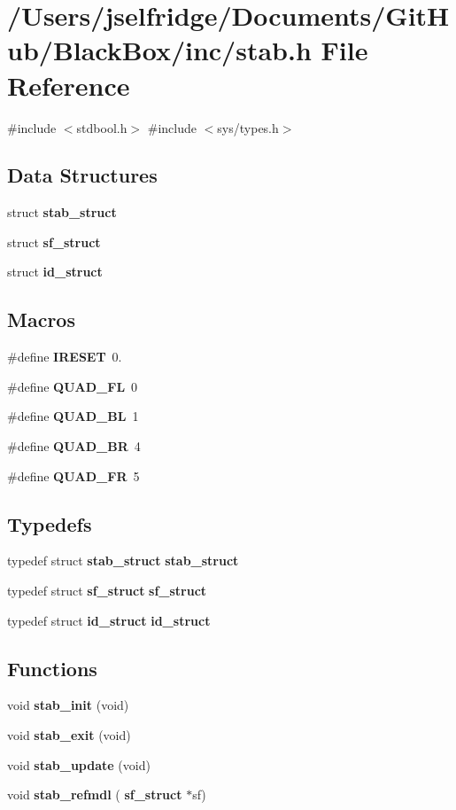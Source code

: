 \section{/\+Users/jselfridge/\+Documents/\+Git\+Hub/\+Black\+Box/inc/stab.h File Reference}
\label{stab_8h}
{\ttfamily \#include $<$stdbool.\+h$>$}\newline
{\ttfamily \#include $<$sys/types.\+h$>$}\newline
\subsection*{Data Structures}
\begin{DoxyCompactItemize}
\item 
struct \textbf{ stab\+\_\+struct}
\item 
struct \textbf{ sf\+\_\+struct}
\item 
struct \textbf{ id\+\_\+struct}
\end{DoxyCompactItemize}
\subsection*{Macros}
\begin{DoxyCompactItemize}
\item 
\#define \textbf{ I\+R\+E\+S\+ET}~0.
\item 
\#define \textbf{ Q\+U\+A\+D\+\_\+\+FL}~0
\item 
\#define \textbf{ Q\+U\+A\+D\+\_\+\+BL}~1
\item 
\#define \textbf{ Q\+U\+A\+D\+\_\+\+BR}~4
\item 
\#define \textbf{ Q\+U\+A\+D\+\_\+\+FR}~5
\end{DoxyCompactItemize}
\subsection*{Typedefs}
\begin{DoxyCompactItemize}
\item 
typedef struct \textbf{ stab\+\_\+struct} \textbf{ stab\+\_\+struct}
\item 
typedef struct \textbf{ sf\+\_\+struct} \textbf{ sf\+\_\+struct}
\item 
typedef struct \textbf{ id\+\_\+struct} \textbf{ id\+\_\+struct}
\end{DoxyCompactItemize}
\subsection*{Functions}
\begin{DoxyCompactItemize}
\item 
void \textbf{ stab\+\_\+init} (void)
\item 
void \textbf{ stab\+\_\+exit} (void)
\item 
void \textbf{ stab\+\_\+update} (void)
\item 
void \textbf{ stab\+\_\+refmdl} (\textbf{ sf\+\_\+struct} $\ast$sf)
\end{DoxyCompactItemize}
